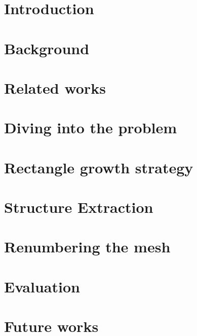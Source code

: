 \documentclass{report}
\begin{document}
\chapter{Introduction}


\chapter{Background}


\chapter{Related works}


\chapter{Diving into the problem}


\chapter{Rectangle growth strategy}


\chapter{Structure Extraction}


\chapter{Renumbering the mesh}


\chapter{Evaluation}


\chapter{Future works}



\nocite{*} %


\end{document}
